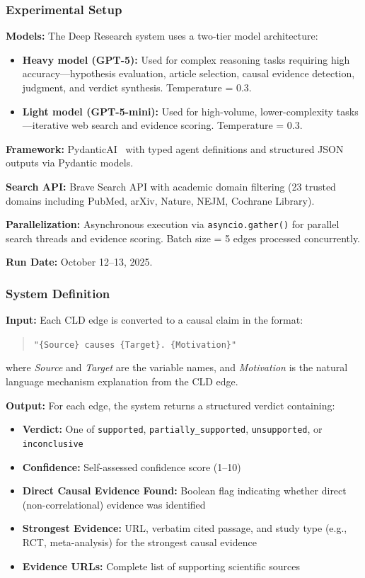 \subsubsection{Experimental Setup}

\textbf{Models:} The Deep Research system uses a two-tier model architecture:
\begin{itemize}[noitemsep]
    \item \textbf{Heavy model (GPT-5):} Used for complex reasoning tasks requiring high accuracy---hypothesis evaluation, article selection, causal evidence detection, judgment, and verdict synthesis. Temperature = 0.3.
    \item \textbf{Light model (GPT-5-mini):} Used for high-volume, lower-complexity tasks---iterative web search and evidence scoring. Temperature = 0.3.
\end{itemize}

\textbf{Framework:} PydanticAI~\cite{pydanticai2024} with typed agent definitions and structured JSON outputs via Pydantic models.

\textbf{Search API:} Brave Search API with academic domain filtering (23 trusted domains including PubMed, arXiv, Nature, NEJM, Cochrane Library).

\textbf{Parallelization:} Asynchronous execution via \texttt{asyncio.gather()} for parallel search threads and evidence scoring. Batch size = 5 edges processed concurrently.

\textbf{Run Date:} October 12--13, 2025.

\subsubsection{System Definition}
\label{sec:rq3_dr_system}

\textbf{Input:} Each CLD edge is converted to a causal claim in the format:
\begin{quote}
\texttt{"\{Source\} causes \{Target\}. \{Motivation\}"}
\end{quote}
where \textit{Source} and \textit{Target} are the variable names, and \textit{Motivation} is the natural language mechanism explanation from the CLD edge.

\textbf{Output:} For each edge, the system returns a structured verdict containing:
\begin{itemize}[noitemsep]
    \item \textbf{Verdict:} One of \texttt{supported}, \texttt{partially\_supported}, \texttt{unsupported}, or \texttt{inconclusive}
    \item \textbf{Confidence:} Self-assessed confidence score (1--10)
    \item \textbf{Direct Causal Evidence Found:} Boolean flag indicating whether direct (non-correlational) evidence was identified
    \item \textbf{Strongest Evidence:} URL, verbatim cited passage, and study type (e.g., RCT, meta-analysis) for the strongest causal evidence
    \item \textbf{Evidence URLs:} Complete list of supporting scientific sources
\end{itemize}

